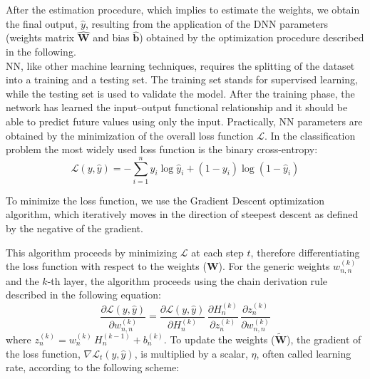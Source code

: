 \documentclass[a4,12pt]{article}
\begin{document}
After the estimation procedure, which implies to estimate the weights, we obtain the final output, $\hat{y}$, resulting from the application of the DNN parameters (weights matrix $\mathbf{\hat{W}}$ and bias $\mathbf{\hat{b}}$) obtained by the optimization procedure described in the following.\\
NN, like other machine learning techniques, requires the splitting of the dataset into a training and a testing set. The training set stands for supervised learning, while the testing set is used to
validate the model. After the training phase, the network has learned the input–output functional relationship and it should be able to predict future values using only the input.
Practically, NN parameters are obtained by the minimization of the overall loss function $\mathcal{L}$. In the classification problem the most widely used loss function is the binary cross-entropy:
$$\mathcal{L}(y,\hat{y})=-\sum_{i=1}^{n} y_{i} \log \hat{y}_{i}+\left(1-y_{i}\right) \log \left(1-\hat{y}_{i}\right)$$

To minimize the loss function, we use the Gradient Descent optimization algorithm, which iteratively moves in the direction of steepest descent as defined by the negative of the gradient.

This algorithm proceeds by minimizing $\mathcal{L}$ at each step $t$,  therefore differentiating the loss function with respect to the weights  ($\mathbf{{W}}$).
For the generic weights $w_{n,n}^{(k)}$ and the $k$-th layer, the algorithm proceeds using the chain derivation rule described in the following equation:
\begin{equation}
\frac{\partial \mathcal{L}(y,\hat{y})}{\partial w_{n,n}^{(k)}} =\frac{\partial \mathcal{L}(y,\hat{y})}{\partial H_n^{(k)}}\,\frac{{\partial H_n^{(k)}}}{\partial z_n^{(k)}} \, \frac{\partial z_n^{(k)}}{\partial w_{n,n}^{(k)}}
 \end{equation}
where $ z_n^{(k)}=w_{n}^{(k)}\,H_{n}^{(k-1)}+b_n^{(k)}$. 
To update the weights ($\mathbf{\tilde{W}}$), the gradient of the loss function, $\nabla \mathcal{L}_t(y,\hat{y})$, is multiplied by a scalar, $\eta$, often called learning rate, according to the following scheme:
\end{document}
